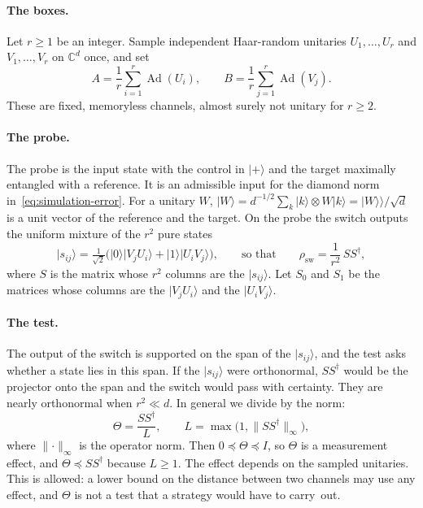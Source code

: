 \documentclass[11pt,letterpaper]{article}
\theoremstyle{definition}\newtheorem{definition}[theorem]{Definition}
\newcommand{\C}{\mathbb C}
\newcommand{\Ad}{\operatorname{Ad}}
\newcommand{\ket}[1]{\lvert#1\rangle}
\newcommand{\vket}[1]{\lvert#1\rangle\!\rangle}
\newcommand{\norm}[1]{\lVert#1\rVert}
\begin{document}
\paragraph{The boxes.}
Let $r\ge1$ be an integer. Sample independent Haar-random unitaries
$U_1,\ldots,U_r$ and $V_1,\ldots,V_r$ on $\C^d$ once, and set
\[
 A=\frac1r\sum_{i=1}^{r}\Ad(U_i),\qquad B=\frac1r\sum_{j=1}^{r}\Ad(V_j).
\]
These are fixed, memoryless channels, almost surely not unitary for
$r\ge2$.

\paragraph{The probe.}
The probe is the input state with the control in $\ket+$ and the target
maximally entangled with a reference. It is an admissible input for the
diamond norm in~\eqref{eq:simulation-error}. For a unitary $W$,
$\ket W=d^{-1/2}\sum_{k}\ket k\otimes W\ket k=\vket W/\sqrt d$ is a unit
vector of the reference and the target. On the probe the switch
outputs the uniform mixture of the $r^2$ pure states
\[
 \ket{s_{ij}}=\tfrac1{\sqrt2}\bigl(\ket0\ket{V_jU_i}+\ket1\ket{U_iV_j}\bigr),
 \qquad\text{so that}\qquad
 \rho_{\mathrm{sw}}=\frac1{r^2}\,SS^\dagger ,
\]
where $S$ is the matrix whose $r^2$ columns are the $\ket{s_{ij}}$.
Let $S_0$ and $S_1$ be the matrices whose columns are the
$\ket{V_jU_i}$ and the $\ket{U_iV_j}$.

\paragraph{The test.}
The output of the switch is supported on the span of the
$\ket{s_{ij}}$, and the test asks whether a state lies in this span. If
the $\ket{s_{ij}}$ were orthonormal, $SS^\dagger$ would be the
projector onto the span and the switch would pass with certainty. They
are nearly orthonormal when $r^2\ll d$. In general we divide by the
norm:
\begin{equation}\label{eq:effect}
 \Theta=\frac{SS^\dagger}L,\qquad L=\max\bigl(1,\norm{SS^\dagger}_\infty\bigr),
\end{equation}
where $\norm{\cdot}_\infty$ is the operator norm. Then
$0\preceq\Theta\preceq I$, so $\Theta$ is a measurement effect, and
$\Theta\preceq SS^\dagger$ because $L\ge1$. The effect depends on the
sampled unitaries. This is allowed: a lower bound on the distance
between two channels may use any effect, and $\Theta$ is not a test
that a strategy would have to carry~out.
\end{document}
